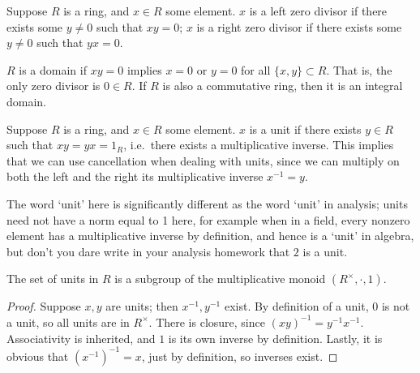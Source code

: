\begin{definition}
    Suppose \(R\) is a ring, and \(x \in R\) some element.
    \(x\) is a left zero divisor if there exists some \(y \neq 0\)
    such that \(xy = 0\);
    \(x\) is a right zero divisor if there exists some \(y \neq 0\)
    such that \(yx = 0\).
\end{definition}
\begin{definition}
    \(R\) is a domain if \(xy = 0\)
    implies \(x = 0\) or \(y = 0\) for all \(\{x,y\} \subset R\).
    That is, the only zero divisor is \(0 \in R\).
    If \(R\) is also a commutative ring,
    then it is an integral domain.
\end{definition}

\begin{definition}
    Suppose \(R\) is a ring, and \(x \in R\) some element.
    \(x\) is a unit if there exists \(y \in R\)
    such that \(xy = yx = 1_R\),
    i.e.\ there exists a multiplicative inverse.
    This implies that we can use cancellation when dealing with units,
    since we can multiply on both the left and the right
    its multiplicative inverse \(x^{-1} = y\).
\end{definition}
\begin{remark}
    The word `unit' here is significantly different
    as the word `unit' in analysis;
    units need not have a norm equal to 1 here,
    for example when in a field,
    every nonzero element has a multiplicative inverse by definition,
    and hence is a `unit' in algebra,
    but don't you dare write in your analysis homework
    that \(2\) is a unit.
\end{remark}
\begin{proposition}\label{prop:ring-unit-subgroup}
    The set of units in \(R\) is a subgroup
    of the multiplicative monoid \((R^\times,\cdot,1)\).
\end{proposition}
\begin{proof}
    Suppose \(x,y\) are units; then \(x^{-1},y^{-1}\) exist.
    By definition of a unit, \(0\) is not a unit,
    so all units are in \(R^\times\).
    There is closure, since \({(xy)}^{-1} = y^{-1}x^{-1}\).
    Associativity is inherited,
    and \(1\) is its own inverse by definition.
    Lastly, it is obvious that \({(x^{-1})}^{-1} = x\),
    just by definition, so inverses exist.
\end{proof}

